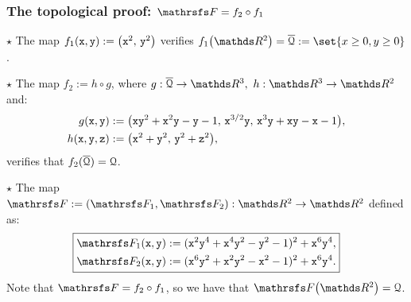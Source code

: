 \documentclass{beamer}
\begin{document}
\begin{frame}
\frametitle{The topological proof: $\FFF=f_2\circ f_1$} 
$\star$ The map $f_1({\tt x},{\tt y}):=\big({\tt x}^2,\,{\tt y}^2\big)$ verifies $f_1\big(\R^2\big)=\overline{\Qu}:=\set{x\ge 0,y\ge 0}$.
\vspace{0.5cm}

$\star$ The map $f_2:=h\circ g$, where $g:\overline{\Qu}\to\R^3,\ h:\R^3\to\R^2$ and:%
\begin{align*}
g({\tt x},{\tt y})&:=\big({\tt x}{\tt y}^2+{\tt x}^2{\tt y}-{\tt y}-1,\,{\tt x}^{3/2}{\tt y},\,{\tt x}^3{\tt y}+{\tt x}{\tt y}-{\tt x}-1\big),\\
h({\tt x},{\tt y},{\tt z})&:=\big({\tt x}^2+{\tt y}^2,\,{\tt y}^2+{\tt z}^2\big),
\end{align*}%
verifies that $f_2(\overline{\mathcal{Q}}) = \mathcal{Q}$.
\vspace{0.5cm}

$\star$ The map $\FFF:= (\FFF_1, \FFF_2):\R^2\to\R^2$ defined as:
\begin{equation*}\label{eq:thirdMap}
\boxed{
\begin{aligned}
\FFF_1({\tt x}, {\tt y}) := ({\tt x}^2{\tt y}^4+{\tt x}^4{\tt y}^2-{\tt y}^2-1)^2+{\tt x}^6{\tt y}^4,\\
\FFF_2(\x, \y) := ({\tt x}^6{\tt y}^2+{\tt x}^2{\tt y}^2-{\tt x}^2-1)^2+{\tt x}^6{\tt y}^4.
\end{aligned}
}
\end{equation*}
Note that $\FFF = f_2 \circ f_1$, so we have that $\FFF\big(\R^2\big) = \Qu$.
\end{frame}
\end{document}
